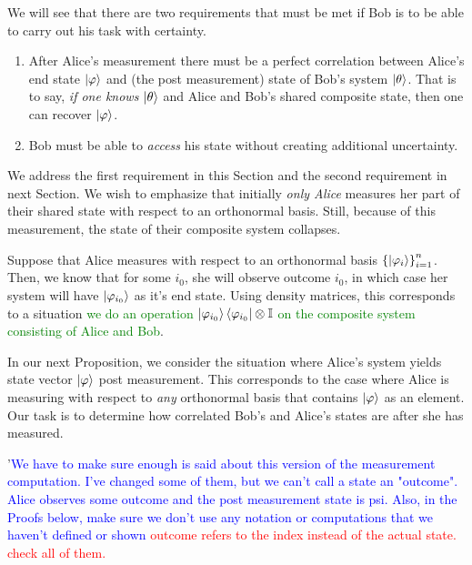 We will see that there are two requirements that must be met if Bob is to be able to carry out his task with certainty.
\begin{enumerate} 
    \item After Alice's measurement there must be a perfect correlation between Alice's end state $\ket{\varphi}$ and (the post measurement) state of Bob's system $\ket{\theta}$.  That is to say, {\emph{if one knows}} $\ket{\theta}$ and Alice and Bob's shared composite state, then one can recover $\ket{\varphi}$.
    \item Bob must be able to {\emph{access}} his state without creating additional uncertainty.
\end{enumerate}

We address the first requirement in this Section and the second requirement in next Section.  We wish to emphasize that initially {\emph{only Alice}} measures her part of their shared state with respect to an orthonormal basis.  Still, because of this measurement, the state of their composite system collapses.  


Suppose that Alice measures with respect to an orthonormal basis ${\{\ket{\varphi_i}\}}_{i=1}^{n}$.  Then, we know that for some $i_0$, she will observe outcome $i_0$, in which case her system will have $\ket{\varphi_{i_0}}$ as it's end state. Using density matrices, this corresponds to a situation \textcolor{green}{we do an operation }
$\ket{\varphi_{i_0}}\bra{\varphi_{i_0}} \otimes \mathbb{I}$ \textcolor{green}{on the composite system consisting of Alice and Bob}.  

In our next Proposition, we consider the situation where Alice's system yields state vector $\ket{\varphi}$ post measurement.  This corresponds to the case where Alice is measuring with respect to {\emph{any}} orthonormal basis that contains $\ket{\varphi}$ as an element. Our task is to determine how correlated Bob's and Alice's states are after she has measured.  


'\textcolor{blue}{We have to make sure enough is said about this version of the measurement computation.  I've changed some of them, but we can't call a state an "outcome".  Alice observes some outcome and the post measurement state is psi.  Also, in the Proofs below, make sure we don't use any notation or computations that we haven't defined or shown}
\textcolor{red}{outcome refers to the index instead of the actual state. check all of them.}

